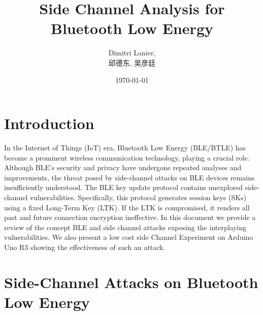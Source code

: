 \documentclass{article}
\begin{document}
\title{Side Channel Analysis for Bluetooth Low Energy}
\author{Dimitri Lanier, \begin{CJK}{UTF8}{gbsn}邱德东, 吴彦廷\end{CJK}}
\date{\today}
\maketitle

\section{Introduction}

In the Internet of Things (IoT) era, Bluetooth Low Energy (BLE/BTLE) has become a prominent wireless communication technology, playing a crucial role. Although BLE's security and privacy have undergone repeated analyses and improvements, the threat posed by side-channel attacks on BLE devices remains insufficiently understood. The BLE key update protocol contains unexplored side-channel vulnerabilities. Specifically, this protocol generates session keys (SKs) using a fixed Long-Term Key (LTK). If the LTK is compromised, it renders all past and future connection encryption ineffective.
In this document we provide a review of the concept BLE and side channel attacks exposing the interplaying vulnerabilities. We also present a low cost side Channel Experiment on Arduino Uno R3 showing the effectiveness of such an attack.
\section{Side-Channel Attacks on Bluetooth Low Energy}
\end{document}
